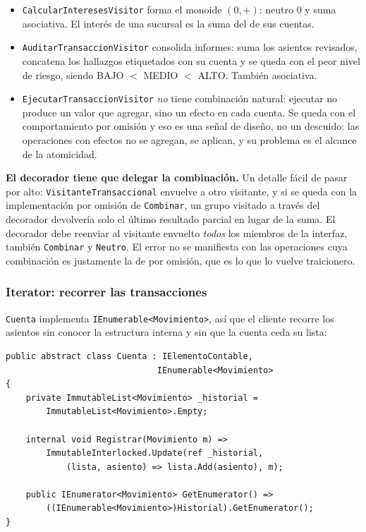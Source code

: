 \begin{itemize}[leftmargin=1.2cm]
    \item \texttt{CalcularInteresesVisitor} forma el monoide $(0, +)$: neutro $0$ y suma
          asociativa. El interés de una sucursal es la suma del de sus cuentas.
    \item \texttt{AuditarTransaccionVisitor} consolida informes: suma los asientos revisados,
          concatena los hallazgos etiquetados con su cuenta y se queda con el peor nivel de
          riesgo, siendo BAJO $<$ MEDIO $<$ ALTO. También asociativa.
    \item \texttt{EjecutarTransaccionVisitor} \emph{no} tiene combinación natural: ejecutar no
          produce un valor que agregar, sino un efecto en cada cuenta. Se queda con el
          comportamiento por omisión y eso es una señal de diseño, no un descuido: las
          operaciones con efectos no se agregan, se aplican, y su problema es el alcance de la
          atomicidad.
\end{itemize}

\textbf{El decorador tiene que delegar la combinación.} Un detalle fácil de pasar por alto:
\texttt{VisitanteTransaccional} envuelve a otro visitante, y si se queda con la implementación
por omisión de \texttt{Combinar}, un grupo visitado a través del decorador devolvería solo el
último resultado parcial en lugar de la suma. El decorador debe reenviar al visitante envuelto
\emph{todos} los miembros de la interfaz, también \texttt{Combinar} y \texttt{Neutro}. El
error no se manifiesta con las operaciones cuya combinación es justamente la de por omisión,
que es lo que lo vuelve traicionero.

\subsubsection*{Iterator: recorrer las transacciones}

\texttt{Cuenta} implementa \texttt{IEnumerable<Movimiento>}, así que el cliente recorre los
asientos sin conocer la estructura interna y sin que la cuenta ceda su lista:

{\small
\begin{verbatim}
public abstract class Cuenta : IElementoContable,
                              IEnumerable<Movimiento>
{
    private ImmutableList<Movimiento> _historial =
        ImmutableList<Movimiento>.Empty;

    internal void Registrar(Movimiento m) =>
        ImmutableInterlocked.Update(ref _historial,
            (lista, asiento) => lista.Add(asiento), m);

    public IEnumerator<Movimiento> GetEnumerator() =>
        ((IEnumerable<Movimiento>)Historial).GetEnumerator();
}
\end{verbatim}
}

